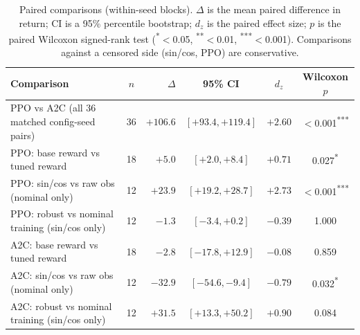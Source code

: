 \begin{table}[t]
\centering
\caption{Paired comparisons (within-seed blocks). $\Delta$ is the mean paired difference in return; CI is a 95\% percentile bootstrap; $d_z$ is the paired effect size; $p$ is the paired Wilcoxon signed-rank test (\textsuperscript{*}$<$0.05, \textsuperscript{**}$<$0.01, \textsuperscript{***}$<$0.001). Comparisons against a censored side (sin/cos, PPO) are conservative.}
\label{tab:exp1_tests}
\begin{tabular}{l c r c c c}
\toprule
Comparison & $n$ & $\Delta$ & 95\% CI & $d_z$ & Wilcoxon $p$ \\
\midrule
PPO vs A2C (all 36 matched config-seed pairs) & 36 & $+106.6$ & $[+93.4, +119.4]$ & $+2.60$ & $<$0.001\textsuperscript{***} \\
PPO: base reward vs tuned reward & 18 & $+5.0$ & $[+2.0, +8.4]$ & $+0.71$ & 0.027\textsuperscript{*} \\
PPO: sin/cos vs raw obs (nominal only) & 12 & $+23.9$ & $[+19.2, +28.7]$ & $+2.73$ & $<$0.001\textsuperscript{***} \\
PPO: robust vs nominal training (sin/cos only) & 12 & $-1.3$ & $[-3.4, +0.2]$ & $-0.39$ & 1.000 \\
A2C: base reward vs tuned reward & 18 & $-2.8$ & $[-17.8, +12.9]$ & $-0.08$ & 0.859 \\
A2C: sin/cos vs raw obs (nominal only) & 12 & $-32.9$ & $[-54.6, -9.4]$ & $-0.79$ & 0.032\textsuperscript{*} \\
A2C: robust vs nominal training (sin/cos only) & 12 & $+31.5$ & $[+13.3, +50.2]$ & $+0.90$ & 0.084 \\
\bottomrule
\end{tabular}
\end{table}
